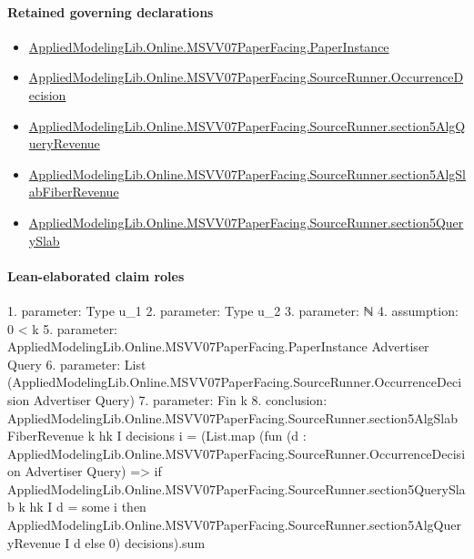 \documentclass[10pt]{article}
\begin{document}
\paragraph{Retained governing declarations}
\begin{itemize}\raggedright
\item \hyperlink{governing-declaration-11907576ec71eeb5}{Applied\allowbreak{}Modeling\allowbreak{}Lib.\allowbreak{}Online.\allowbreak{}MSVV07\allowbreak{}Paper\allowbreak{}Facing.\allowbreak{}Paper\allowbreak{}Instance}
\item \hyperlink{governing-declaration-97202a3921106ed9}{Applied\allowbreak{}Modeling\allowbreak{}Lib.\allowbreak{}Online.\allowbreak{}MSVV07\allowbreak{}Paper\allowbreak{}Facing.\allowbreak{}Source\allowbreak{}Runner.\allowbreak{}Occurrence\allowbreak{}Decision}
\item \hyperlink{paper-prerequisite-6614623e33a6b961}{Applied\allowbreak{}Modeling\allowbreak{}Lib.\allowbreak{}Online.\allowbreak{}MSVV07\allowbreak{}Paper\allowbreak{}Facing.\allowbreak{}Source\allowbreak{}Runner.\allowbreak{}section5\allowbreak{}Alg\allowbreak{}Query\allowbreak{}Revenue}
\item \hyperlink{governing-declaration-9919ddf87c3d275c}{Applied\allowbreak{}Modeling\allowbreak{}Lib.\allowbreak{}Online.\allowbreak{}MSVV07\allowbreak{}Paper\allowbreak{}Facing.\allowbreak{}Source\allowbreak{}Runner.\allowbreak{}section5\allowbreak{}Alg\allowbreak{}Slab\allowbreak{}Fiber\allowbreak{}Revenue}
\item \hyperlink{paper-prerequisite-a90247cabf8cc2bf}{Applied\allowbreak{}Modeling\allowbreak{}Lib.\allowbreak{}Online.\allowbreak{}MSVV07\allowbreak{}Paper\allowbreak{}Facing.\allowbreak{}Source\allowbreak{}Runner.\allowbreak{}section5\allowbreak{}Query\allowbreak{}Slab}
\end{itemize}
\paragraph{Lean-elaborated claim roles}\begin{ReviewVerbatim}
1. parameter: Type u_1
2. parameter: Type u_2
3. parameter: ℕ
4. assumption: 0 < k
5. parameter: AppliedModelingLib.Online.MSVV07PaperFacing.PaperInstance Advertiser Query
6. parameter: List (AppliedModelingLib.Online.MSVV07PaperFacing.SourceRunner.OccurrenceDecision Advertiser Query)
7. parameter: Fin k
8. conclusion: AppliedModelingLib.Online.MSVV07PaperFacing.SourceRunner.section5AlgSlabFiberRevenue k hk I decisions i =
  (List.map
      (fun (d : AppliedModelingLib.Online.MSVV07PaperFacing.SourceRunner.OccurrenceDecision Advertiser Query) =>
        if AppliedModelingLib.Online.MSVV07PaperFacing.SourceRunner.section5QuerySlab k hk I d = some i then
          AppliedModelingLib.Online.MSVV07PaperFacing.SourceRunner.section5AlgQueryRevenue I d
        else 0)
      decisions).sum
\end{ReviewVerbatim}
\end{document}
